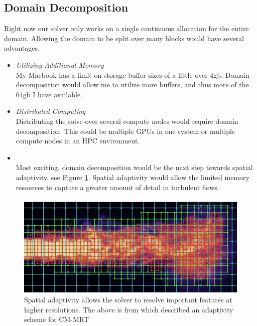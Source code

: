 \subsection{Domain Decomposition}
Right now our solver only works on a single continuous allocation
for the entire domain.
Allowing the domain to be split over many blocks would have several 
advantages.
\begin{itemize}
  \item \textit{Utilizing Additional Memory } \\
My Macbook has a limit on storage buffer sizes of a little over $4$gb.
Domain decomposition would allow me to utilize more buffers, and thus more of the $64$gb I have available.

  \item \textit{Distributed Computing} \\
Distributing the solve over several compute nodes would require 
domain decomposition. 
This could be multiple GPUs in one system or
multiple compute nodes in an HPC environment.

  \item {} \\
Most exciting, domain decomposition would be the next step towards spatial adaptivity, see Figure \ref{fig:adaptivity}. 
Spatial adaptivity would allow the limited memory resources to
capture a greater amount of detail in turbulent flows.
\end{itemize}
\begin{figure}
\label{fig:adaptivity}
\begin{center}
  \includegraphics[width=0.6\linewidth]{adaptivity.png}
\end{center}
\caption{Spatial adaptivity allows the solver to resolve important features at higher resolutions. The above is from \cite{Li2018} which described an adaptivity scheme for CM-MRT}
\end{figure}
